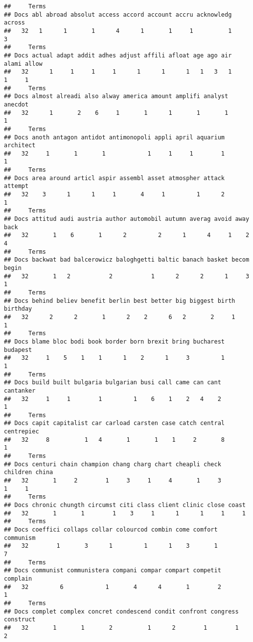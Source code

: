 \documentclass[]{article}
\begin{document}
\begin{verbatim}
##     Terms
## Docs abl abroad absolut access accord account accru acknowledg across
##   32   1      1       1      4      1       1     1          1      3
##     Terms
## Docs actual adapt addit adhes adjust affili afloat age ago air alami allow
##   32      1     1     1     1      1      1      1   1   3   1     1     1
##     Terms
## Docs almost alreadi also alway america amount amplifi analyst anecdot
##   32      1       2    6     1       1      1       1       1       1
##     Terms
## Docs anoth antagon antidot antimonopoli appli april aquarium architect
##   32     1       1       1            1     1     1        1         1
##     Terms
## Docs area around articl aspir assembl asset atmospher attack attempt
##   32    3      1      1     1       4     1         1      2       1
##     Terms
## Docs attitud audi austria author automobil autumn averag avoid away back
##   32       1    6       1      2         2      1      4     1    2    4
##     Terms
## Docs backwat bad balcerowicz baloghgetti baltic banach basket becom begin
##   32       1   2           2           1      2      2      1     3     1
##     Terms
## Docs behind believ benefit berlin best better big biggest birth birthday
##   32      2      2       1      2    2      6   2       2     1        1
##     Terms
## Docs blame bloc bodi book border born brexit bring bucharest budapest
##   32     1    5    1    1      1    2      1     3         1        1
##     Terms
## Docs build built bulgaria bulgarian busi call came can cant cantanker
##   32     1     1        1         1    6    1    2   4    2         1
##     Terms
## Docs capit capitalist car carload carsten case catch central centrepiec
##   32     8          1   4       1       1    1     2       8          1
##     Terms
## Docs centuri chain champion chang charg chart cheapli check children china
##   32       1     2        1     3     1     4       1     3        1     1
##     Terms
## Docs chronic chungth circumst citi class client clinic close coast
##   32       1       1        1    3     1      1      1     1     1
##     Terms
## Docs coeffici collaps collar colourcod combin come comfort communism
##   32        1       3      1         1      1    3       1         7
##     Terms
## Docs communist communistera compani compar compart competit complain
##   32         6            1       4      4       1        2        1
##     Terms
## Docs complet complex concret condescend condit confront congress construct
##   32       1       1       2          1      2        1        1         2

\end{verbatim}
\end{document}
